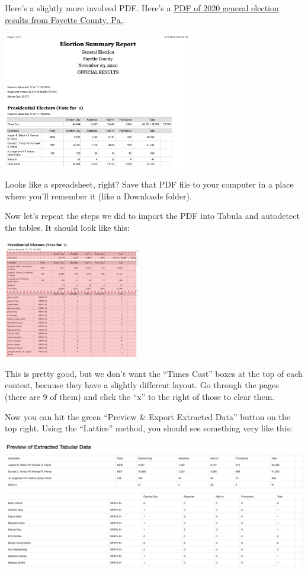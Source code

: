 \documentclass[
  letterpaper,
  DIV=11,
  numbers=noendperiod]{scrreprt}
\begin{document}
Here's a slightly more involved PDF. Here's a
\href{https://raw.githubusercontent.com/openelections/openelections-sources-pa/master/2020/general/Fayette\%20PA\%202020\%20General\%20Summary.pdf}{PDF
of 2020 general election results from Fayette County, Pa.}.

\includegraphics[width=3.27in,height=\textheight]{./images/fayette_1.png}

Looks like a spreadsheet, right? Save that PDF file to your computer in
a place where you'll remember it (like a Downloads folder).

Now let's repeat the steps we did to import the PDF into Tabula and
autodetect the tables. It should look like this:

\includegraphics[width=2.33in,height=\textheight]{./images/fayette_2.png}

This is pretty good, but we don't want the ``Times Cast'' boxes at the
top of each contest, because they have a slightly different layout. Go
through the pages (there are 9 of them) and click the ``x'' to the right
of those to clear them.

Now you can hit the green ``Preview \& Export Extracted Data'' button on
the top right. Using the ``Lattice'' method, you should see something
very like this:

\includegraphics[width=5.54in,height=\textheight]{./images/fayette_3.png}
\end{document}
